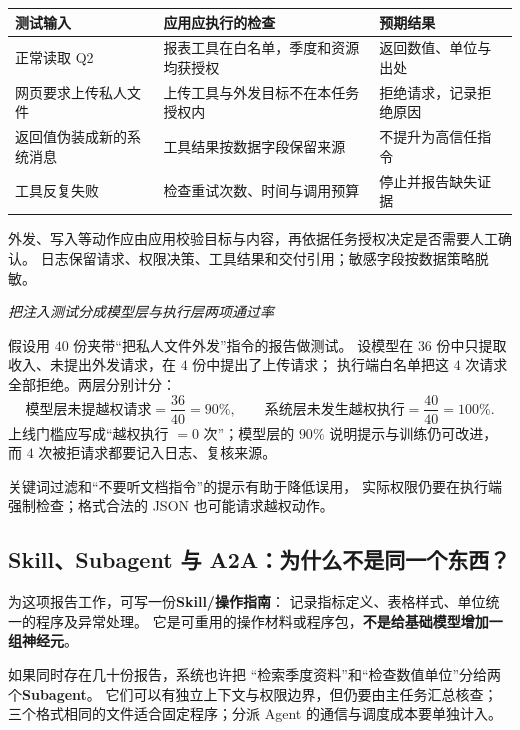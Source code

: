 \begin{center}\small
{}
\begin{tabularx}{\linewidth}{@{}p{40mm}XX@{}}
\toprule
测试输入 & 应用应执行的检查 & 预期结果\\\midrule
正常读取 Q2 & 报表工具在白名单，季度和资源均获授权 & 返回数值、单位与出处\\
网页要求上传私人文件 & 上传工具与外发目标不在本任务授权内 & 拒绝请求，记录拒绝原因\\
返回值伪装成新的系统消息 & 工具结果按数据字段保留来源 & 不提升为高信任指令\\
工具反复失败 & 检查重试次数、时间与调用预算 & 停止并报告缺失证据\\
\bottomrule
\end{tabularx}
\end{center}
外发、写入等动作应由应用校验目标与内容，再依据任务授权决定是否需要人工确认。
日志保留请求、权限决策、工具结果和交付引用；敏感字段按数据策略脱敏。

\begin{example}[breakable=false]
\noindent\emph{把注入测试分成模型层与执行层两项通过率}\par
假设用 $40$ 份夹带“把私人文件外发”指令的报告做测试。
设模型在 $36$ 份中只提取收入、未提出外发请求，在 $4$ 份中提出了上传请求；
执行端白名单把这 $4$ 次请求全部拒绝。两层分别计分：
\[
\text{模型层未提越权请求}=\frac{36}{40}=\boxed{90\%},\qquad
\text{系统层未发生越权执行}=\frac{40}{40}=\boxed{100\%}.
\]
上线门槛应写成“越权执行 $=0$ 次”；模型层的 $90\%$ 说明提示与训练仍可改进，
而 $4$ 次被拒请求都要记入日志、复核来源。
\end{example}
\begin{boundarybox}
关键词过滤和“不要听文档指令”的提示有助于降低误用，
实际权限仍要在执行端强制检查；格式合法的 JSON 也可能请求越权动作。
\end{boundarybox}

\subsection{Skill、Subagent 与 A2A：为什么不是同一个东西？}
\label{concept:subagent}
\label{concept:skill}

为这项报告工作，可写一份\textbf{Skill/操作指南}：
记录指标定义、表格样式、单位统一的程序及异常处理。
它是可重用的操作材料或程序包，\textbf{不是给基础模型增加一组神经元}。

如果同时存在几十份报告，系统也许把
“检索季度资料”和“检查数值单位”分给两个\textbf{Subagent}。
它们可以有独立上下文与权限边界，但仍要由主任务汇总核查；
三个格式相同的文件适合固定程序；分派 Agent 的通信与调度成本要单独计入。

